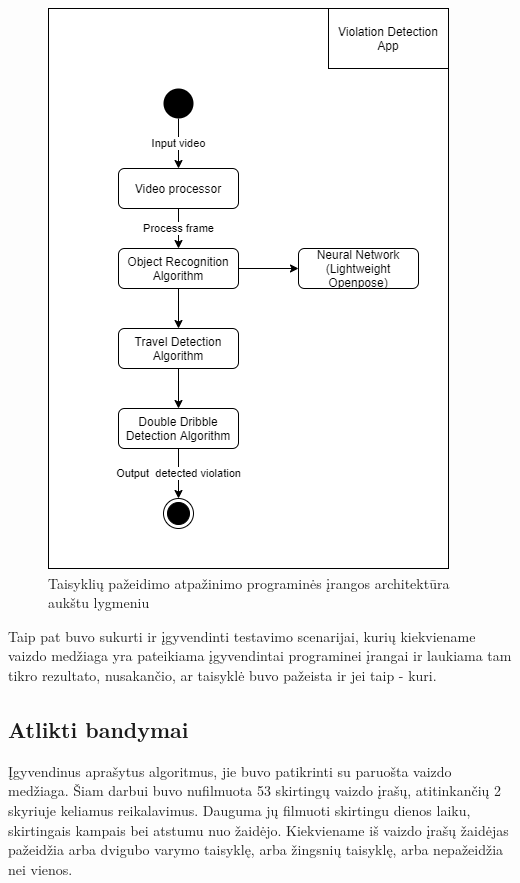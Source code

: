 \documentclass{VUMIFPSbakalaurinis}
\begin{document}
\begin{figure}[H]
	\centering
	\includegraphics[scale=0.6]{img/program_architecture}
	\caption{Taisyklių pažeidimo atpažinimo programinės įrangos architektūra aukštu lygmeniu}
	\label{img:program_architecture}
\end{figure}

Taip pat buvo sukurti ir įgyvendinti testavimo scenarijai, kurių kiekviename vaizdo medžiaga yra pateikiama įgyvendintai programinei įrangai ir laukiama tam tikro rezultato, nusakančio, ar taisyklė buvo pažeista ir jei taip - kuri.  

\subsection{Atlikti bandymai}
Įgyvendinus aprašytus algoritmus, jie buvo patikrinti su paruošta vaizdo medžiaga. Šiam darbui buvo nufilmuota 53 skirtingų vaizdo įrašų, atitinkančių 2 skyriuje keliamus reikalavimus. Dauguma jų filmuoti skirtingu dienos laiku, skirtingais kampais bei atstumu nuo žaidėjo. Kiekviename iš vaizdo įrašų žaidėjas pažeidžia arba dvigubo varymo taisyklę, arba žingsnių taisyklę, arba nepažeidžia nei vienos.  
\end{document}
